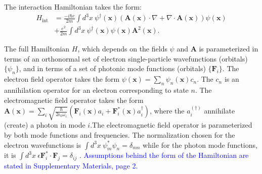 \documentclass[aps,prl,twocolumn,
	groupedaddress,superscriptaddress,
	amsfonts,amssymb,amsmath,floatfix,
	citeautoscript]{revtex4-1}
\begin{document}
The interaction Hamiltonian takes the form:
\begin{align}
H_{\mathrm{int}} &= \frac{-i\hbar e}{2m}\int d^3x ~\psi^{\dagger}(\mathbf{x})(\mathbf{A}(\mathbf{x})\cdot\nabla +  \nabla \cdot \mathbf{A}(\mathbf{x}))\psi(\mathbf{x}) \nonumber \\ &+ \frac{e^2}{2m}\int d^3x ~\psi^{\dagger}(\mathbf{x})\psi(\mathbf{x})\mathbf{A}^2(\mathbf{x}).
\end{align}

The full Hamiltonian $H$, which depends on the fields $\psi$ and $\mathbf{A}$ is parameterized in terms of an orthonormal set of electron single-particle wavefunctions (orbitals) $\{\psi_n\}$, and in terms of a set of photonic mode functions (orbitals) $\{\mathbf{F}_i\}$. The electron field operator takes the form $\psi(\mathbf{x}) = \sum_n \psi_n(\mathbf{x})c_n$.
The $c_n$ is an annihilation operator for an electron corresponding to state $n$. The electromagnetic field operator takes the form $\mathbf{A}(\mathbf{x}) = \sum_i\sqrt{\frac{\hbar}{2\epsilon_0\omega_i}} \left(\mathbf{F}_i(\mathbf{x})a_i+\mathbf{F}^*_i(\mathbf{x})a^{\dagger}_i\right)$, where the $a_i^{(\dagger)}$ annihilate (create) a photon in mode $i$.The electromagnetic field operator is parameterized by both mode functions and  frequencies. The normalization chosen for the electron wavefunctions is $\int d^3x~ \psi_m^*\psi_n = \delta_{mn}$ while for the photon mode functions, it is $\int d^3x~\epsilon\mathbf{F}_i^*\cdot\mathbf{F}_j = \delta_{ij}$ \cite{joannopoulos2011photonic}. \textcolor{blue}{Assumptions behind the form of the Hamiltonian are stated in Supplementary Materials, page 2.}

\end{document}
